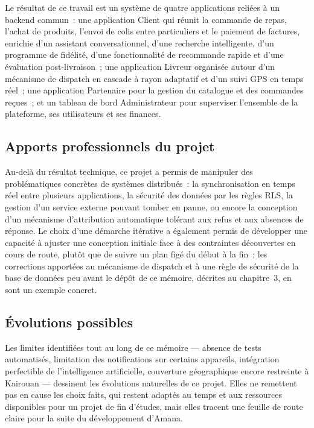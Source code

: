 \documentclass[12pt,fleqn,a4paper]{report}
\begin{document}
\begin{justify}
Le résultat de ce travail est un système de quatre applications reliées à un backend commun~: une application Client qui réunit la commande de repas, l'achat de produits, l'envoi de colis entre particuliers et le paiement de factures, enrichie d'un assistant conversationnel, d'une recherche intelligente, d'un programme de fidélité, d'une fonctionnalité de recommande rapide et d'une évaluation post-livraison~; une application Livreur organisée autour d'un mécanisme de dispatch en cascade à rayon adaptatif et d'un suivi GPS en temps réel~; une application Partenaire pour la gestion du catalogue et des commandes reçues~; et un tableau de bord Administrateur pour superviser l'ensemble de la plateforme, ses utilisateurs et ses finances.

\subsection*{Apports professionnels du projet}

Au-delà du résultat technique, ce projet a permis de manipuler des problématiques concrètes de systèmes distribués~: la synchronisation en temps réel entre plusieurs applications, la sécurité des données par les règles RLS, la gestion d'un service externe pouvant tomber en panne, ou encore la conception d'un mécanisme d'attribution automatique tolérant aux refus et aux absences de réponse. Le choix d'une démarche itérative a également permis de développer une capacité à ajuster une conception initiale face à des contraintes découvertes en cours de route, plutôt que de suivre un plan figé du début à la fin~; les corrections apportées au mécanisme de dispatch et à une règle de sécurité de la base de données peu avant le dépôt de ce mémoire, décrites au chapitre~3, en sont un exemple concret.

\subsection*{Évolutions possibles}

Les limites identifiées tout au long de ce mémoire — absence de tests automatisés, limitation des notifications sur certains appareils, intégration perfectible de l'intelligence artificielle, couverture géographique encore restreinte à Kairouan — dessinent les évolutions naturelles de ce projet. Elles ne remettent pas en cause les choix faits, qui restent adaptés au temps et aux ressources disponibles pour un projet de fin d'études, mais elles tracent une feuille de route claire pour la suite du développement d'Amana.


\end{justify}
\end{document}
